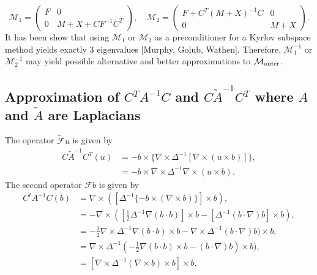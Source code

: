 \documentclass{article}
\begin{document}
\begin{equation}
    \mathcal{M}_{1} = 
    \begin{pmatrix}
        F & 0 \\
        0 & M+X + CF^{-1}C^{T}
    \end{pmatrix}, \quad
    \mathcal{M}_{2} = 
    \begin{pmatrix}
        F+C^T(M+X)^{-1}C & 0 \\
        0 & M+X
    \end{pmatrix}.
\end{equation}
It has been show that using $\mathcal{M}_1$ or $\mathcal{M}_2$ as a preconditioner for a Kyrlov subspace method yields exactly 3 eigenvalues [Murphy, Golub, Wathen]. Therefore, $\mathcal{M}_1^{-1}$ or $\mathcal{M}_2^{-1}$ may yield possible alternative and better approximations to $\mathcal{M}_{\rm outer}$.

\subsection{Approximation of $C^TA^{-1}C$ and $C\tilde{A}^{-1}C^T$ where $A$ and $\tilde{A}$ are Laplacians}

The operator $\tilde{\mathcal{F}}u$ is given by 
\begin{equation}
\begin{array}{cl}
C\tilde{A}^{-1}C^T(u) &= -b \times \{ \nabla \times \Delta^{-1} [\nabla \times (u\times b)]\}, \\
&= -b\times \nabla\times \Delta^{-1} \nabla \times (u\times b).
\end{array}
\end{equation}
The second operator $\mathcal{F}b$ is given by
\begin{equation}
\begin{array}{cl}
C^t{A}^{-1}C(b) &= \nabla \times ( [\Delta^{-1}\{ -b\times(\nabla \times b)\}] \times b),\\
&= -\nabla \times ([\frac{1}{2}\Delta^{-1}\nabla (b\cdot b)]\times b - [\Delta^{-1}(b\cdot\nabla)b]\times b),\\
&= -\frac{1}{2}\nabla \times \Delta^{-1}\nabla (b\cdot b)\times b - \nabla \times \Delta^{-1}(b\cdot\nabla)b)\times b,\\
&= \nabla \times \Delta^{-1}(-\frac{1}{2}\nabla (b\cdot b)\times b -(b\cdot\nabla)b)\times b),\\
&= [\nabla \times \Delta^{-1}(\nabla \times b)\times b]\times b.
\end{array}
\end{equation}
\end{document}
